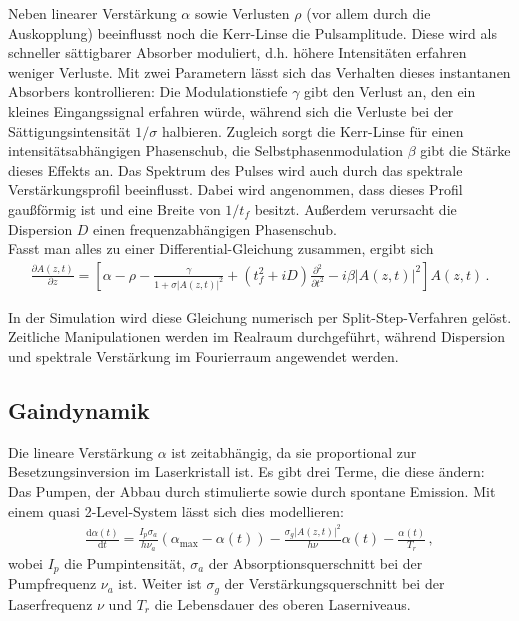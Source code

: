 \documentclass[bachelor,       %
               twoside,        %
               BCOR10mm,       %
               liststotoc,nomtotoc,bibtotoc, %
               english,ngerman, %
               final,          %
               ]{GAUBM}
\newcommand{\dif}{\ensuremath{\mathrm{d}}}
\begin{document}
Neben linearer Verstärkung $\alpha$ sowie Verlusten $\rho$ (vor allem durch die Auskopplung) beeinflusst noch die Kerr-Linse die Pulsamplitude.
Diese wird als schneller sättigbarer Absorber moduliert, d.h. höhere Intensitäten erfahren weniger Verluste.
Mit zwei Parametern lässt sich das Verhalten dieses instantanen Absorbers kontrollieren: 
Die Modulationstiefe $\gamma$ gibt den Verlust an, den ein kleines Eingangssignal erfahren würde, während sich die Verluste bei der Sättigungsintensität $1/\sigma$ halbieren.
Zugleich sorgt die Kerr-Linse für einen intensitätsabhängigen Phasenschub, die Selbstphasenmodulation $\beta$ gibt die Stärke dieses Effekts an.
Das Spektrum des Pulses wird auch durch das spektrale Verstärkungsprofil beeinflusst.
Dabei wird angenommen, dass dieses Profil gaußförmig ist und eine Breite von $1/t_f$ besitzt.
Außerdem verursacht die Dispersion $D$ einen frequenzabhängigen Phasenschub.\\
Fasst man alles zu einer Differential-Gleichung zusammen, ergibt sich
\begin{align}
	\frac{\partial A(z,t)}{\partial z}=\left[\alpha-\rho-\frac{\gamma}{1+\sigma|A(z,t)|^2}+(t_f^2+iD)\frac{\partial^2}{\partial t^2}-i\beta |A(z,t)|^2\right]A(z,t) \,.
	\label{eq:ginzburgLandau}
\end{align}

In der Simulation wird diese Gleichung numerisch per Split-Step-Verfahren gelöst.
Zeitliche Manipulationen werden im Realraum durchgeführt, während Dispersion und spektrale Verstärkung im Fourierraum angewendet werden.

\subsection{Gaindynamik}
Die lineare Verstärkung $\alpha$ ist zeitabhängig, da sie proportional zur Besetzungsinversion im Laserkristall ist.
Es gibt drei Terme, die diese ändern:
Das Pumpen, der Abbau durch stimulierte sowie durch spontane Emission.
Mit einem quasi 2-Level-System lässt sich dies modellieren:
\begin{align}
	\frac{\dif \alpha(t)}{\dif t}=\frac{I_p\sigma_a}{h\nu_a}(\alpha_\text{max}-\alpha(t))-\frac{\sigma_g|A(z,t)|^2}{h\nu}\alpha(t)-\frac{\alpha(t)}{T_r}\,,
\end{align}
wobei $I_p$ die Pumpintensität, $\sigma_a$ der Absorptionsquerschnitt bei der Pumpfrequenz $\nu_a$ ist.
Weiter ist $\sigma_g$ der Verstärkungsquerschnitt bei der Laserfrequenz $\nu$ und $T_r$ die Lebensdauer des oberen Laserniveaus.
\end{document}
